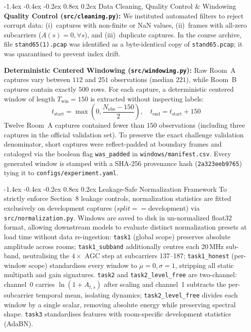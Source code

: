 \documentclass[10pt,a4paper]{article}
\makeatletter
\renewcommand{\subsection}{\@startsection{subsection}{2}{\z@}%
  {-1.4ex \@plus -0.4ex \@minus -0.2ex}%
  {0.8ex \@plus 0.2ex}%
  {\normalfont\normalsize\bfseries\color{secondary}}}
\makeatother
\begin{document}
\subsection{Data Cleaning, Quality Control \& Windowing}
\textbf{Quality Control (\texttt{src/cleaning.py}):} We instituted automated filters to reject corrupt data: (i)~captures with non-finite or NaN values, (ii)~frames with all-zero subcarriers ($A(s) = 0, \forall s$), and (iii)~duplicate captures. In the course archive, file \texttt{stand65(1).pcap} was identified as a byte-identical copy of \texttt{stand65.pcap}; it was quarantined to prevent index drift.

\noindent\textbf{Deterministic Centered Windowing (\texttt{src/windowing.py}):} Raw Room~A captures vary between $112$ and $251$ observations (median $221$), while Room~B captures contain exactly $500$ rows. For each capture, a deterministic centered window of length $T_{\text{win}}=150$ is extracted without inspecting labels:
\begin{equation}
    t_{\text{start}} = \max\left(0, \frac{N_{\text{obs}} - 150}{2}\right), \quad t_{\text{end}} = t_{\text{start}} + 150
\end{equation}
Twelve Room~A captures contained fewer than $150$ observations (including three captures in the official validation set). To preserve the exact challenge validation denominator, short captures were reflect-padded at boundary frames and cataloged via the boolean flag \texttt{was\_padded} in \texttt{windows/manifest.csv}. Every generated window is stamped with a SHA-256 provenance hash (\texttt{2a323eeb9765}) tying it to \texttt{configs/experiment.yaml}.

\subsection{Leakage-Safe Normalization Framework}
To strictly enforce Section~8 leakage controls, normalization statistics are fitted exclusively on development captures ($split == \text{development}$) via \texttt{src/normalization.py}. Windows are saved to disk in un-normalized float32 format, allowing downstream models to evaluate distinct normalization presets at load time without data re-ingestion:
\texttt{task1} (global scope) preserves absolute amplitude across rooms; \texttt{task1\_subband} additionally centres each 20\,MHz sub-band, neutralising the $4\times$ AGC step at subcarriers 137--187; \texttt{task1\_honest} (per-window scope) standardises every window to $\mu=0,\sigma=1$, stripping all static multipath and gain signatures. \texttt{task2} and \texttt{task2\_level\_free} are two-channel: channel~0 carries $\ln(1+A_{t,s})$ after scaling and channel~1 subtracts the per-subcarrier temporal mean, isolating dynamics; \texttt{task2\_level\_free} divides each window by a single scalar, removing absolute energy while preserving spectral shape. \texttt{task3} standardises features with room-specific development statistics (AdaBN).
\end{document}
